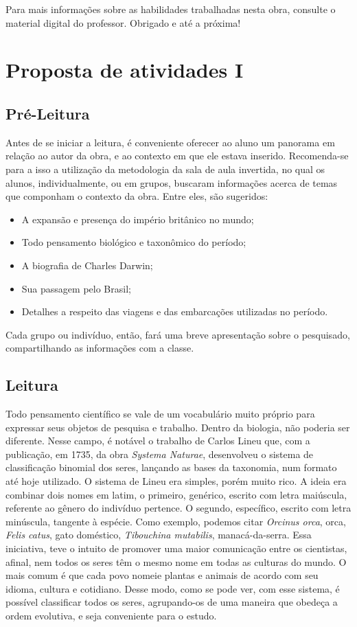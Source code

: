 \documentclass[12pt]{extarticle}
\begin{document}
Para mais informações sobre as habilidades trabalhadas nesta obra, consulte o material digital do professor. Obrigado e até a próxima!

\section{Proposta de atividades I}


\subsection{Pré-Leitura}

Antes de se iniciar a leitura, é conveniente oferecer ao
aluno um panorama em relação ao autor da obra, e ao contexto em que ele
estava inserido. Recomenda-se para a isso a utilização da metodologia da
sala de aula invertida, no qual os alunos, individualmente, ou em
grupos, buscaram informações acerca de temas que componham o contexto da
obra. Entre eles, são sugeridos:

\begin{itemize}
\item
  A expansão e presença do império britânico no mundo;
\item
  Todo pensamento biológico e taxonômico do período;
\item
  A biografia de Charles Darwin;
\item
  Sua passagem pelo Brasil;
\item
  Detalhes a respeito das viagens e das embarcações utilizadas no
  período.
\end{itemize}

Cada grupo ou indivíduo, então, fará uma breve apresentação sobre o
pesquisado, compartilhando as informações com a classe.

\subsection{Leitura}


Todo pensamento científico se vale de um vocabulário muito
próprio para expressar seus objetos de pesquisa e trabalho. Dentro da
biologia, não poderia ser diferente. Nesse campo, é notável o trabalho
de Carlos Lineu que, com a publicação, em 1735, da obra \emph{Systema
Naturae}, desenvolveu o sistema de classificação binomial dos seres,
lançando as bases da taxonomia, num formato até hoje utilizado. O
sistema de Lineu era simples, porém muito rico. A ideia era combinar
dois nomes em latim, o primeiro, genérico, escrito com letra maiúscula,
referente ao gênero do indivíduo pertence. O segundo, específico,
escrito com letra minúscula, tangente à espécie. Como exemplo, podemos
citar \emph{Orcinus orca}, orca, \emph{Felis catus}, gato doméstico,
\emph{Tibouchina mutabilis}, manacá-da-serra. Essa iniciativa, teve o
intuito de promover uma maior comunicação entre os cientistas, afinal,
nem todos os seres têm o mesmo nome em todas as culturas do mundo. O
mais comum é que cada povo nomeie plantas e animais de acordo com seu
idioma, cultura e cotidiano. Desse modo, como se pode ver, com esse
sistema, é possível classificar todos os seres, agrupando-os de uma
maneira que obedeça a ordem evolutiva, e seja conveniente para o estudo.
\end{document}
